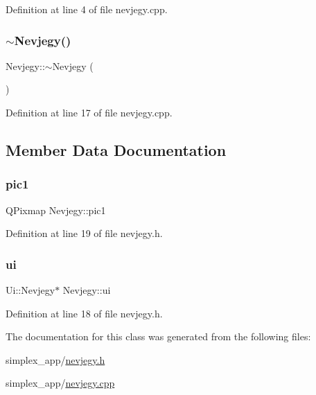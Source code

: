 Definition at line 4 of file nevjegy.\+cpp.

\mbox{\label{classNevjegy_a9521f7b858472228b5b8d39438b67432}} 
\subsubsection{\texorpdfstring{$\sim$\+Nevjegy()}{~Nevjegy()}}
{\footnotesize\ttfamily Nevjegy\+::$\sim$\+Nevjegy (\begin{DoxyParamCaption}{ }\end{DoxyParamCaption})}



Definition at line 17 of file nevjegy.\+cpp.



\subsection{Member Data Documentation}
\mbox{\label{classNevjegy_a4d025918cbecfe2da5184b98e63501df}} 
\subsubsection{\texorpdfstring{pic1}{pic1}}
{\footnotesize\ttfamily Q\+Pixmap Nevjegy\+::pic1\hspace{0.3cm}{\ttfamily [private]}}



Definition at line 19 of file nevjegy.\+h.

\mbox{\label{classNevjegy_ad971d94faab06f49928fb7f0b844105f}} 
\subsubsection{\texorpdfstring{ui}{ui}}
{\footnotesize\ttfamily Ui\+::\+Nevjegy$\ast$ Nevjegy\+::ui\hspace{0.3cm}{\ttfamily [private]}}



Definition at line 18 of file nevjegy.\+h.



The documentation for this class was generated from the following files\+:\begin{DoxyCompactItemize}
\item 
simplex\+\_\+app/\hyperlink{nevjegy_8h}{nevjegy.\+h}\item 
simplex\+\_\+app/\hyperlink{nevjegy_8cpp}{nevjegy.\+cpp}\end{DoxyCompactItemize}
